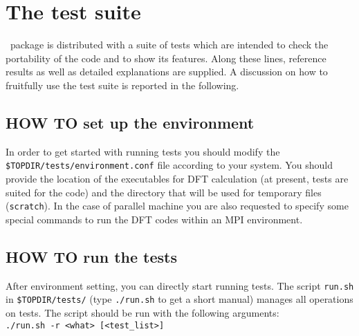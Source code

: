 
\thispagestyle{empty}
\section{The test suite}
\label{section:test}
%
\WANT\ package is distributed with a suite of tests which are
intended to check the portability of the code and to show its
features. Along these lines, reference results as well as detailed
explanations are supplied.  A discussion on how to fruitfully use
the test suite is reported in the following.

\subsection*{HOW TO set up the environment}
     In order to get started with running tests you should modify the
     {\tt \$TOPDIR/tests/environment.conf} file according to your system.
     You should provide the location of the executables for DFT calculation
     (at present, tests are suited for the \PWSCF code) and the directory
     that will be used for temporary files ({\tt scratch}).
     In the case of parallel machine you are also requested to
     specify some special commands to run the DFT codes within an
     MPI environment.

\subsection*{HOW TO run the tests}
     After environment setting, you can directly start running tests. The
     script {\tt run.sh} in {\tt \$TOPDIR/tests/} (type {\tt ./run.sh} to get a
     short manual) manages all operations on tests.
     The script should be run with the following arguments: \\

     {\tt  ./run.sh -r <what>  [<test\_list>] } \\

